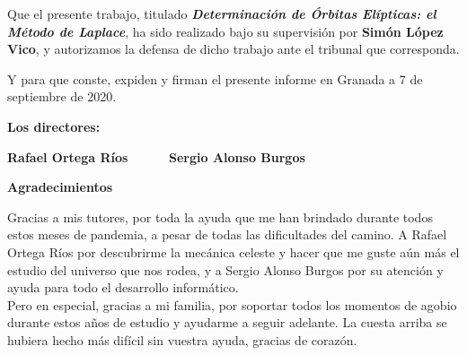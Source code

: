 Que el presente trabajo, titulado \textit{\textbf{Determinación de Órbitas Elípticas: el Método de Laplace}}, ha sido realizado bajo su supervisión por \textbf{Simón López Vico}, y autorizamos la defensa de dicho trabajo ante el tribunal que corresponda.

\vspace{0.5cm}

Y para que conste, expiden y firman el presente informe en Granada a 7 de septiembre de 2020.

\vspace{1cm}

\textbf{Los directores:}

\vspace{5cm}

\noindent \textbf{Rafael Ortega Ríos \ \ \ \ \ Sergio Alonso Burgos}


\clearpage{\thispagestyle{empty}\cleardoublepage}

\thispagestyle{empty}


\begin{Huge}
\textbf{Agradecimientos}
\end{Huge}
\thispagestyle{empty}

\vspace{1cm}

Gracias a mis tutores, por toda la ayuda que me han brindado durante todos estos meses de pandemia, a pesar de todas las dificultades del camino. A Rafael Ortega Ríos por descubrirme la mecánica celeste y hacer que me guste aún más el estudio del universo que nos rodea, y a Sergio Alonso Burgos por su atención y ayuda para todo el desarrollo informático.\\

Pero en especial, gracias a mi familia, por soportar todos los momentos de agobio durante estos años de estudio y ayudarme a seguir adelante. La cuesta arriba se hubiera hecho más difícil sin vuestra ayuda, gracias de corazón.

\clearpage{\thispagestyle{empty}\cleardoublepage}

\thispagestyle{empty}

